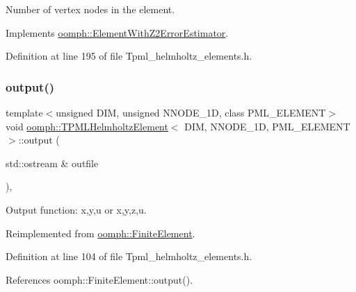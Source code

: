 Number of vertex nodes in the element. 



Implements \hyperlink{classoomph_1_1ElementWithZ2ErrorEstimator_a19495a0e77ef4ff35f15fdf7913b4077}{oomph\+::\+Element\+With\+Z2\+Error\+Estimator}.



Definition at line 195 of file Tpml\+\_\+helmholtz\+\_\+elements.\+h.

\mbox{\label{classoomph_1_1TPMLHelmholtzElement_a9dbd17c84f5b1f058ba8373daa03f7cd}} 
\subsubsection{\texorpdfstring{output()}{output()}\hspace{0.1cm}{\footnotesize\ttfamily [1/4]}}
{\footnotesize\ttfamily template$<$unsigned D\+IM, unsigned N\+N\+O\+D\+E\+\_\+1D, class P\+M\+L\+\_\+\+E\+L\+E\+M\+E\+NT$>$ \\
void \hyperlink{classoomph_1_1TPMLHelmholtzElement}{oomph\+::\+T\+P\+M\+L\+Helmholtz\+Element}$<$ D\+IM, N\+N\+O\+D\+E\+\_\+1D, P\+M\+L\+\_\+\+E\+L\+E\+M\+E\+NT $>$\+::output (\begin{DoxyParamCaption}\item[{std\+::ostream \&}]{outfile }\end{DoxyParamCaption})\hspace{0.3cm}{\ttfamily [inline]}, {\ttfamily [virtual]}}



Output function\+: x,y,u or x,y,z,u. 



Reimplemented from \hyperlink{classoomph_1_1FiniteElement_a2ad98a3d2ef4999f1bef62c0ff13f2a7}{oomph\+::\+Finite\+Element}.



Definition at line 104 of file Tpml\+\_\+helmholtz\+\_\+elements.\+h.



References oomph\+::\+Finite\+Element\+::output().

\mbox{\label{classoomph_1_1TPMLHelmholtzElement_aa261cc229bf205167b1105e55385862b}} 
